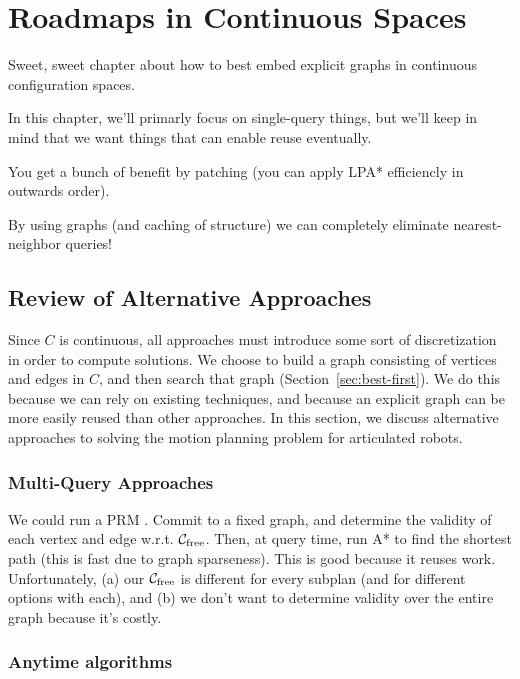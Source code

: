 \chapter{Roadmaps in Continuous Spaces}
\label{chap:graphs-in-continuous}

Sweet, sweet chapter about how to best embed explicit graphs
in continuous configuration spaces.

In this chapter,
we'll primarly focus on single-query things,
but we'll keep in mind that we want things that can enable reuse eventually.

You get a bunch of benefit by patching
(you can apply LPA* efficiencly in outwards order).

By using graphs (and caching of structure)
we can completely eliminate nearest-neighbor queries!

\section{Review of Alternative Approaches}
\label{sec:related-work}

Since $C$ is continuous,
all approaches must introduce some sort of discretization
in order to compute solutions.
We choose to build a graph consisting of vertices and edges in $C$,
and then search that graph (Section~\ref{sec:best-first}).
We do this because we can rely on existing techniques,
and because an explicit graph can be more easily reused than other
approaches.
In this section, we discuss alternative approaches to solving
the motion planning problem for articulated robots.

\subsection{Multi-Query Approaches}

We could run a PRM \cite{kavrakietal1996prm}.
Commit to a fixed graph,
and determine the validity of each vertex and edge w.r.t.
$\mathcal{C}_{\mbox{\scriptsize free}}$.
Then, at query time,
run A* to find the shortest path (this is fast due to graph sparseness).
This is good because it reuses work.
Unfortunately,
(a) our $\mathcal{C}_{\mbox{\scriptsize free}}$
is different for every subplan
(and for different options with each),
and (b) we don't want to determine validity over the entire graph
because it's costly.

\subsection{Anytime algorithms}

